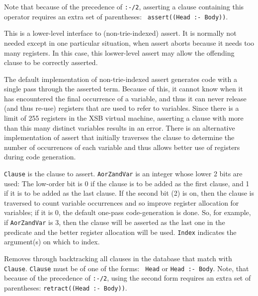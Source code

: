 \begin{description}
Note that because of the precedence of {\tt :-/2}, asserting a clause
containing this operator requires an extra set of parentheses: {\tt
  assert((Head :- Body))}.

This is a lower-level interface to (non-trie-indexed) assert.  It is
normally not needed except in one particular situation, when assert
aborts because it needs too many registers.  In this case, this
loswer-level assert may allow the offending clause to be correctly
asserted.

The default implementation of non-trie-indexed assert generates code
with a single pass through the asserted term.  Because of this, it
cannot know when it has encountered the final occurrence of a
variable, and thus it can never release (and thus re-use) registers
that are used to refer to variables.  Since there is a limit of 255
registers in the XSB virtual machine, asserting a clause with more
than this many distinct variables results in an error.  There is an
alternative implementation of assert that initially traverses the
clause to determine the number of occurrences of each variable and
thus allows better use of registers during code generation.

{\tt Clause} is the clause to assert. {\tt AorZandVar} is an integer
whose lower 2 bits are used: The low-order bit is 0 if the clause is
to be added as the first clause, and 1 if it is to be added as the
last clause. If the second bit (2) is on, then the clause is traversed
to count variable occurrences and so improve register allocation for
variables; if it is 0, the default one-pass code-generation is done.
So, for example, if {\tt AorZandVar} is 3, then the clause will be
asserted as the last one in the predicate and the better register
allocation will be used.  {\tt Index} indicates the argument(s) on
which to index.

%
Removes through backtracking all clauses in the database that match
with {\tt Clause}.  {\tt Clause} must be of one of the forms: {\tt
  Head} or {\tt Head :- Body}.  Note, that because of the precedence
of {\tt :-/2}, using the second form requires an extra set of
parentheses: {\tt retract((Head :- Body))}.  


\end{description}
